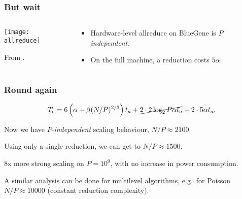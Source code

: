 \documentclass[presentation]{beamer}
\begin{document}
\begin{frame}
  \frametitle{But wait}
  \begin{columns}
    \begin{column}{0.6\textwidth}
      \texttt{[image: allreduce]}

      From \textcite{Fischer:2015}.
    \end{column}
    \begin{column}{0.4\textwidth}
      \begin{itemize}
      \item Hardware-level allreduce on BlueGene is \emph{$P$
          independent}.
      \item On the full machine, a reduction costs $5\alpha$.
      \end{itemize}
    \end{column}
  \end{columns}
\end{frame}

\begin{frame}
  \frametitle{Round again}
  \begin{equation*}
    T_c = 6 \left(\alpha + \beta (N/P)^{2/3}\right)t_a +
    \cancel{2\cdot 2 \log_2 P \alpha t_a} + 2 \cdot 5 \alpha t_a.
  \end{equation*}

  Now we have $P$-\emph{independent} scaling behaviour, $N/P \approx 2100$.

  Using only a single reduction, we can get to $N/P \approx
  1500$.

  8x more strong scaling on $P=10^9$, with no increase in
  power consumption.

  A similar analysis can be done for multilevel algorithms,
  e.g.~for Poisson $N/P \approx 10000$ (constant reduction complexity).
\end{frame}
\end{document}
